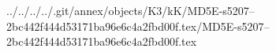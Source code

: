 ../../../../.git/annex/objects/K3/kK/MD5E-s5207--2bc442f444d53171ba96e6c4a2fbd00f.tex/MD5E-s5207--2bc442f444d53171ba96e6c4a2fbd00f.tex